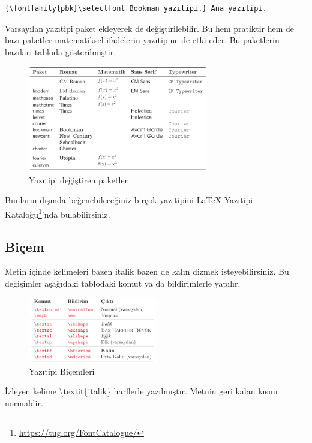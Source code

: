 \documentclass[
  10pt,
]{scrbook}
\newenvironment{Shaded}{\begin{snugshade}}{\end{snugshade}}
\newcommand{\FunctionTok}[1]{\textcolor[rgb]{0.00,0.00,0.00}{#1}}
\newcommand{\NormalTok}[1]{#1}
\renewcommand{\href}[2]{#2\footnote{\url{#1}}}
\theoremstyle{definition}
\theoremstyle{definition}
\theoremstyle{definition}
\theoremstyle{definition}
\theoremstyle{remark}
\begin{document}
\begin{verbatim}
{\fontfamily{pbk}\selectfont Bookman yazıtipi.} Ana yazıtipi.
\end{verbatim}

Varsayılan yazıtipi paket ekleyerek de değiştirilebilir. Bu hem pratiktir hem de bazı paketler matematiksel ifadelerin yazıtipine de etki eder. Bu paketlerin bazıları tabloda gösterilmiştir.

\begin{figure}
\centering
\includegraphics[width=0.7\textwidth,height=\textheight]{images/yazitipi6.png}
\caption{Yazıtipi değiştiren paketler}
\end{figure}

Bunların dışında beğenebileceğiniz birçok yazıtipini \href{https://tug.org/FontCatalogue/}{LaTeX Yazıtipi Kataloğu}'nda bulabilirsiniz.

\hypertarget{biuxe7em}{%
\subsection{Biçem}\label{biuxe7em}}

Metin içinde kelimeleri bazen italik bazen de kalın dizmek isteyebilirsiniz. Bu değişimler aşağıdaki tablodaki komut ya da bildirimlerle yapılır.

\begin{figure}
\centering
\includegraphics[width=0.5\textwidth,height=\textheight]{images/yazitipi7.png}
\caption{Yazıtipi Biçemleri}
\end{figure}

\begin{Shaded}
\begin{Highlighting}[]
\NormalTok{İzleyen kelime }\FunctionTok{\textbackslash{}textit}\NormalTok{\{italik\} }
\NormalTok{harflerle yazılmıştır.}
\NormalTok{Metnin geri kalan kısmı}
\NormalTok{normaldir.}
\end{Highlighting}
\end{Shaded}
\end{document}
